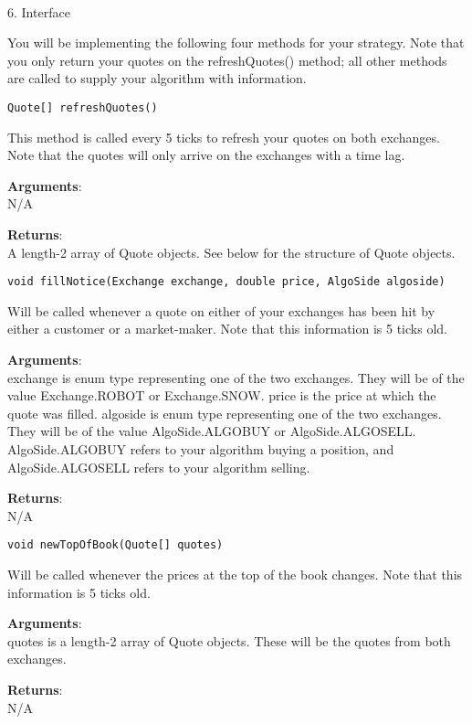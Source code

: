 \documentclass[12pt]{article}
\begin{document}
\ \\
\begin{center}6. Interface\end{center}

You will be implementing the following four methods for your strategy. Note that you only return your quotes on the refreshQuotes() method; all other methods are called to supply your algorithm with information.
\begin{framed}
\begin{verbatim}Quote[] refreshQuotes()\end{verbatim}
This method is called every 5 ticks to refresh your quotes on both exchanges. Note that the quotes will only arrive on the exchanges with a time lag.

\textbf{Arguments}: \\
N/A

\textbf{Returns}: \\
A length-2 array of Quote objects. See below for the structure of Quote objects.
\end{framed}

\begin{framed}
\begin{verbatim}void fillNotice(Exchange exchange, double price, AlgoSide algoside)\end{verbatim}
Will be called whenever a quote on either of your exchanges has been hit by either a customer or a market-maker. Note that this information is 5 ticks old.

\textbf{Arguments}: \\
exchange is enum type representing one of the two exchanges. They will be of the value Exchange.ROBOT or Exchange.SNOW.
price is the price at which the quote was filled.
algoside is enum type representing one of the two exchanges. They will be of the value AlgoSide.ALGOBUY or AlgoSide.ALGOSELL. AlgoSide.ALGOBUY refers to your algorithm buying a position, and AlgoSide.ALGOSELL refers to your algorithm selling.

\textbf{Returns}: \\
N/A
\end{framed}

\begin{framed}
\begin{verbatim}void newTopOfBook(Quote[] quotes)\end{verbatim}
Will be called whenever the prices at the top of the book changes. Note that this information is 5 ticks old.

\textbf{Arguments}: \\
quotes is a length-2 array of Quote objects. These will be the quotes from both exchanges.

\textbf{Returns}: \\
N/A
\end{framed}
\end{document}
